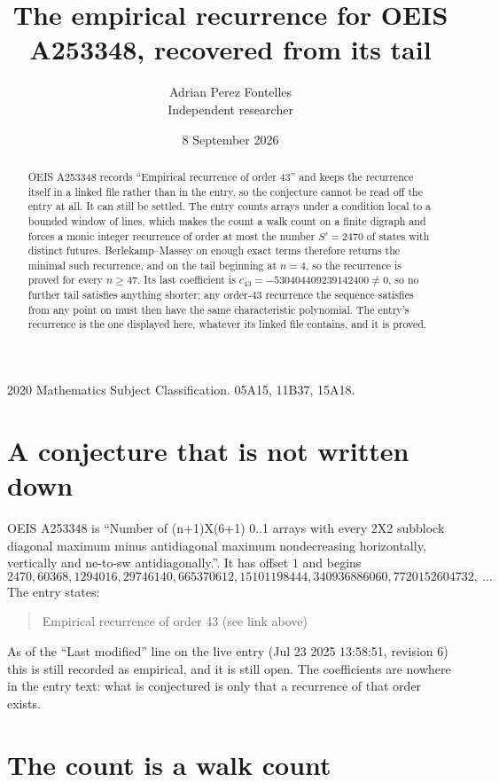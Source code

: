 \documentclass[11pt,a4paper]{article}
\title{The empirical recurrence for OEIS A253348, recovered from its tail}
\author{Adrian Perez Fontelles\\ \small Independent researcher}
\date{8 September 2026}
\theoremstyle{plain}
\theoremstyle{definition}
\begin{document}
\maketitle

\begin{abstract}
OEIS A253348 records ``Empirical recurrence of order $43$'' and keeps the recurrence itself in
a linked file rather than in the entry, so the conjecture cannot be read off the entry at all.
It can still be settled. The entry counts arrays under a condition local to a bounded window of
lines, which makes the count a walk count on a finite digraph and forces a monic integer
recurrence of order at most the number $S'=2470$ of states with distinct futures. Berlekamp--Massey on
enough exact terms therefore returns the minimal such recurrence, and on the tail beginning at $n=4$, so the recurrence is proved for every $n\ge47$.
Its last coefficient is $c_{43}=-530404409239142400\neq0$, so no further tail satisfies anything
shorter; any order-$43$ recurrence the sequence satisfies from any point on must then have
the same characteristic polynomial. The entry's recurrence is the one displayed here, whatever
its linked file contains, and it is proved.
\end{abstract}

\noindent\small 2020 Mathematics Subject Classification. 05A15, 11B37, 15A18.\normalsize

\section{A conjecture that is not written down}

OEIS A253348 is ``Number of (n+1)X(6+1) 0..1 arrays with every 2X2 subblock diagonal maximum minus antidiagonal maximum nondecreasing horizontally, vertically and ne-to-sw antidiagonally.''. It has offset $1$ and begins
\[
2470, 60368, 1294016, 29746140, 665370612, 15101198444, 340936886060, 7720152604732,\ \dots
\]
The entry states:
\begin{quote}
Empirical recurrence of order 43 (see link above)
\end{quote}
As of the ``Last modified'' line on the live entry (Jul 23 2025 13:58:51, revision 6)
this is still recorded as empirical, and it is still open. The coefficients are nowhere in the
entry text: what is conjectured is only that a recurrence of that order exists.

\section{The count is a walk count}
\end{document}
